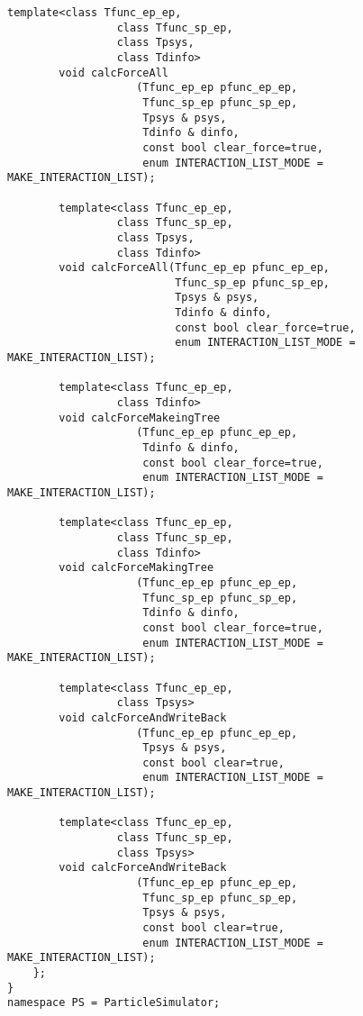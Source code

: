 \begin{lstlisting}[caption=TreeForForce1]
        template<class Tfunc_ep_ep,
                 class Tfunc_sp_ep,
                 class Tpsys,
                 class Tdinfo>
        void calcForceAll
                    (Tfunc_ep_ep pfunc_ep_ep,
                     Tfunc_sp_ep pfunc_sp_ep,
                     Tpsys & psys,
                     Tdinfo & dinfo,
                     const bool clear_force=true,
                     enum INTERACTION_LIST_MODE = MAKE_INTERACTION_LIST);
                     
        template<class Tfunc_ep_ep,
                 class Tfunc_sp_ep,
                 class Tpsys,
                 class Tdinfo>
        void calcForceAll(Tfunc_ep_ep pfunc_ep_ep,
                          Tfunc_sp_ep pfunc_sp_ep,
                          Tpsys & psys,
                          Tdinfo & dinfo,
                          const bool clear_force=true,
                          enum INTERACTION_LIST_MODE = MAKE_INTERACTION_LIST);

        template<class Tfunc_ep_ep,
                 class Tdinfo>
        void calcForceMakeingTree
                    (Tfunc_ep_ep pfunc_ep_ep,
                     Tdinfo & dinfo,
                     const bool clear_force=true,
                     enum INTERACTION_LIST_MODE = MAKE_INTERACTION_LIST);
                     
        template<class Tfunc_ep_ep,
                 class Tfunc_sp_ep,
                 class Tdinfo>
        void calcForceMakingTree
                    (Tfunc_ep_ep pfunc_ep_ep,
                     Tfunc_sp_ep pfunc_sp_ep,
                     Tdinfo & dinfo,
                     const bool clear_force=true,
                     enum INTERACTION_LIST_MODE = MAKE_INTERACTION_LIST);

        template<class Tfunc_ep_ep,
                 class Tpsys>
        void calcForceAndWriteBack
                    (Tfunc_ep_ep pfunc_ep_ep,
                     Tpsys & psys,
                     const bool clear=true,
                     enum INTERACTION_LIST_MODE = MAKE_INTERACTION_LIST);
                     
        template<class Tfunc_ep_ep,
                 class Tfunc_sp_ep,
                 class Tpsys>
        void calcForceAndWriteBack
                    (Tfunc_ep_ep pfunc_ep_ep,
                     Tfunc_sp_ep pfunc_sp_ep,
                     Tpsys & psys,
                     const bool clear=true,
                     enum INTERACTION_LIST_MODE = MAKE_INTERACTION_LIST);
    };
}
namespace PS = ParticleSimulator;
\end{lstlisting}

